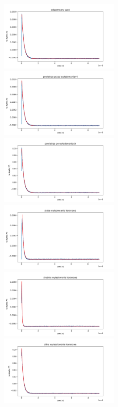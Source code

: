 \documentclass[10pt,a4paper]{article}
\begin{document}
\newpage

\begin{figure}[h]
    \centering
    \includegraphics[width=6cm]{nitrogen.pdf}
    \includegraphics[width=6cm]{air1.pdf}
    \includegraphics[width=6cm]{air2.pdf}
    \includegraphics[width=6cm]{crone1.pdf}
    \includegraphics[width=6cm]{crone2.pdf}
    \includegraphics[width=6cm]{crone3.pdf}

\end{figure}
\end{document}
